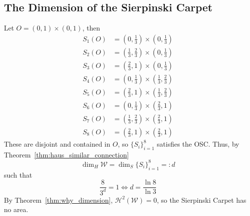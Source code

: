 \documentclass{article}
\theoremstyle{plain}
\theoremstyle{definition}
\theoremstyle{remark}
\begin{document}
\subsection{The Dimension of the Sierpinski Carpet}
Let $O = (0,1) \times (0,1)$, then 
\begin{align*}
    S_1(O) & = \left (0, \frac{1}{3} \right) \times \left (0, \frac{1}{3} \right)\\ 
    S_2(O) & = \left (\frac{1}{3}, \frac{2}{3} \right) \times \left (0, \frac{1}{3} \right)\\ 
    S_3(O) & = \left (\frac{2}{3}, 1 \right) \times \left (0, \frac{1}{3} \right)\\ 
    S_4(O) & = \left (0, \frac{1}{3} \right) \times \left (\frac{1}{3}, \frac{2}{3} \right)\\ 
    S_5(O) & = \left (\frac{2}{3}, 1 \right) \times \left (\frac{1}{3}, \frac{2}{3} \right)\\ 
    S_6(O) & = \left (0, \frac{1}{3} \right) \times \left (\frac{2}{3}, 1 \right)\\ 
    S_7(O) & = \left (\frac{1}{3}, \frac{2}{3} \right) \times \left (\frac{2}{3}, 1 \right)\\ 
    S_8(O) & = \left (\frac{2}{3}, 1 \right) \times \left (\frac{2}{3}, 1 \right)
\end{align*}
These are disjoint and contained in $O$, so $\{S_i\}_{i=1}^8$ satisfies the OSC. Thus, by Theorem~\ref{thm:haus_similar_connection} \[
\dim _H \mathcal{W} = \dim _S \{S_i\}_{i=1}^8 =:d
\]
such that \[\frac{8}{3^d} = 1 \iff d = \frac{\ln 8}{\ln 3}\]
By Theorem~\ref{thm:why_dimension}, $\mathcal{H}^2(\mathcal{W}) = 0$, so the Sierpinski Carpet has no area.
\end{document}

